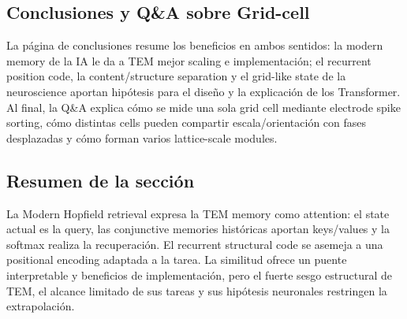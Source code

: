 \subsection{Conclusiones y Q\&A sobre Grid-cell}

La página de conclusiones resume los beneficios en ambos sentidos: la modern memory de la IA le da a TEM mejor scaling e implementación; el recurrent position code, la content/structure separation y el grid-like state de la neuroscience aportan hipótesis para el diseño y la explicación de los Transformer. Al final, la Q\&A explica cómo se mide una sola grid cell mediante electrode spike sorting, cómo distintas cells pueden compartir escala/orientación con fases desplazadas y cómo forman varios lattice-scale modules.



\subsection{Resumen de la sección}

La Modern Hopfield retrieval expresa la TEM memory como attention: el state actual es la query, las conjunctive memories históricas aportan keys/values y la softmax realiza la recuperación. El recurrent structural code se asemeja a una positional encoding adaptada a la tarea. La similitud ofrece un puente interpretable y beneficios de implementación, pero el fuerte sesgo estructural de TEM, el alcance limitado de sus tareas y sus hipótesis neuronales restringen la extrapolación.
